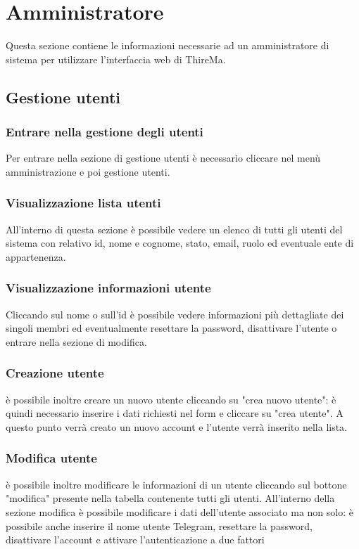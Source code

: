 \section{Amministratore}
Questa sezione contiene le informazioni necessarie ad un amministratore di sistema per utilizzare l'interfaccia web di ThireMa.

\subsection{Gestione utenti}

	\subsubsection{Entrare nella gestione degli utenti}
		Per entrare nella sezione di gestione utenti è necessario cliccare nel menù amministrazione e poi gestione utenti. 

	\subsubsection{Visualizzazione lista utenti}	
		All'interno di questa sezione è possibile vedere un elenco di tutti gli utenti del sistema con relativo id, nome e cognome, stato, email, ruolo ed eventuale ente di appartenenza. 

	\subsubsection{Visualizzazione informazioni utente}	
		Cliccando sul nome o sull'id è possibile vedere informazioni più dettagliate dei singoli membri ed eventualmente resettare la password, disattivare l'utente o entrare nella sezione di modifica.

	\subsubsection{Creazione utente}

		è possibile inoltre creare un nuovo utente cliccando su "crea nuovo utente": è quindi necessario inserire i dati richiesti nel form e cliccare su "crea utente". A questo punto verrà creato un nuovo account e l'utente verrà inserito nella lista.

	\subsubsection{Modifica utente}
		è possibile inoltre modificare le informazioni di un utente cliccando sul bottone "modifica" presente nella tabella contenente tutti gli utenti. All'interno della sezione modifica è possibile modificare i dati dell'utente associato ma non solo: è possibile anche inserire il nome utente Telegram, resettare la password, disattivare l'account e attivare l'autenticazione a due fattori


